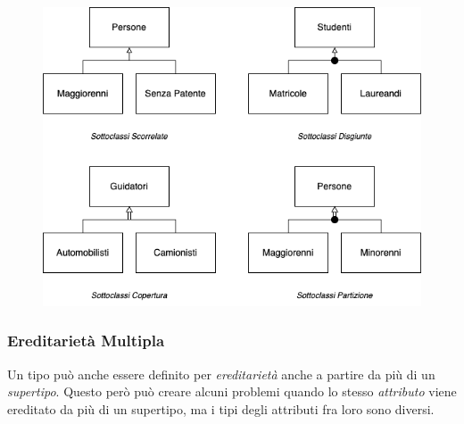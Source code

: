 \begin{figure}[h]
    \centering
    \includegraphics[scale=0.6]{img/gerarchie.png}
\end{figure}

\subsubsection{Ereditarietà Multipla}

Un tipo può anche essere definito per \emph{ereditarietà} anche a partire da più di un
\emph{supertipo}. Questo però può creare alcuni problemi quando lo stesso \emph{attributo} viene ereditato
da più di un supertipo, ma i tipi degli attributi fra loro sono diversi.